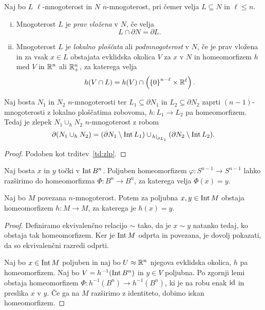 \begin{definicija}
Naj bo $L$ $\ell$-mnogoterost in $N$ $n$-mnogoterost, pri čemer
velja $L \subseteq N$ in $\ell \leq n$.

\begin{enumerate}[i)]
\item Mnogoterost $L$ je
\emph{prav vložena} v $N$, če velja
\[
L \cap \partial N = \partial L.
\]
\item Mnogoterost $L$ je
\emph{lokalno ploščata} ali
\emph{podmnogoterost} v $N$, če je prav vložena in za vsak
$x \in L$ obstajata evklidska okolica $V$ za $x$ v $N$ in
homeomorfizem $h$ med $V$ in $\mathbb{R}^n$ ali $\mathbb{R}_+^n$, za katerega velja
\[
h(V \cap L) =
h(V) \cap \left(\left\{0\right\}^{n - \ell} \times \mathbb{R}^\ell\right).
\]
\end{enumerate}
\end{definicija}

\begin{izrek}
Naj bosta $N_1$ in $N_2$ $n$-mnogoterosti ter
$L_1 \subseteq \partial N_1$ in $L_2 \subseteq \partial N_2$ zaprti
$(n-1)$-mnogoterosti z lokalno ploščatima robovoma,
$h \colon L_1 \to L_2$ pa homeomorfizem. Tedaj je zlepek
$N_1 \cup_h N_2$ $n$-mnogoterost z robom
\[
\partial (N_1 \cup_h N_2) =
(\partial N_1 \setminus \operatorname{Int} L_1)
\cup_{\left. h\right|_{\partial L_1}^{}}
(\partial N_2 \setminus \operatorname{Int} L_2).
\]
\end{izrek}

\begin{proof}
Podoben kot trditev~\ref{td:zlp}.
\end{proof}

\begin{lema}
Naj bosta $x$ in $y$ točki v $\operatorname{Int} B^n$. Poljuben homeomorfizem
$\varphi \colon S^{n-1} \to S^{n-1}$ lahko razširimo do
homeomorfizma $\Phi \colon B^n \to B^n$, za katerega velja
$\Phi(x) = y$.
\end{lema}

\begin{izrek}
Naj bo $M$ povezana $n$-mnogoterost. Potem za poljubna
$x, y \in \operatorname{Int} M$ obstaja homeomorfizem $h \colon M \to M$, za
katerega je $h(x) = y$.
\end{izrek}

\begin{proof}
Definiramo ekvivalenčno relacijo $\sim$ tako, da je $x \sim y$
natanko tedaj, ko obstaja tak homeomorfizem. Ker je $\operatorname{Int} M$
odprta in povezana, je dovolj pokazati, da so ekvivalenčni razredi
odprti.

Naj bo $x \in \operatorname{Int} M$ poljuben in naj bo $U \approx \mathbb{R}^n$
njegova evklidska okolica, $h$ pa homeomorfizem. Naj bo
$V = h^{-1}(\operatorname{Int} B^n)$ in $y \in V$ poljubna. Po zgornji lemi
obstaja homeomorfizem $\Phi \colon h^{-1}(B^n) \to h^{-1}(B^n)$, ki
je na robu enak $\operatorname{id}$ in preslika $x$ v $y$. Če ga na $M$ razširimo
z identiteto, dobimo iskan homeomorfizem.
\end{proof}

